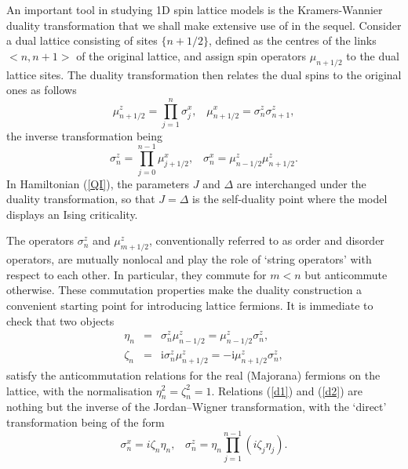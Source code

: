 An important tool in studying 1D spin lattice models
is the Kramers-Wannier duality transformation that
we shall make extensive use of in the sequel. Consider
a dual lattice consisting of sites
$\{n +1/2\}$,
defined as the centres of the links $< n,n+1>$
of the original lattice, and assign spin operators
$\mu_{n+1/2}$ to the dual lattice sites.
The duality transformation then
relates the dual spins to the original ones as
follows
\begin{equation}
\mu^z_{n+1/2}=\prod\limits_{j=1}^n\sigma^x_j,\;\;\;
\mu^x_{n+1/2}=\sigma^z_n\sigma^z_{n+1},
\label{dual}
\end{equation}
the inverse transformation being
\begin{equation}
\sigma^z_{n}=\prod\limits_{j=0}^{n-1}\mu^x_{j+1/2},\;\;\;
\sigma^x_{n}=\mu^z_{n-1/2}\mu^z_{n+1/2}.
\label{dualinv}
\end{equation}
In Hamiltonian (\ref{QI}), the parameters $J$ and
$\Delta$ are interchanged under the duality transformation, so
that $J=\Delta$ is the self-duality point where the
model displays an Ising criticality.

The operators $\sigma^z_n$ and $\mu^z_{m+1/2}$, conventionally referred
to as order and disorder operators,
are mutually nonlocal and
play the role
of `string operators' with respect to each other. In
particular,
they commute for $m<n$ but anticommute
otherwise.
These commutation properties make the duality
construction
a convenient starting point for introducing lattice
fermions. It is immediate to check that two objects
\begin{eqnarray}
\eta_n &=& \sigma^z _n \mu^z _{n-1/2} = \mu^z _{n-1/2}\sigma^z _n, \label{d1}\\
\zeta_n &=& \mbox{i} \sigma^z _n \mu^z _{n+1/2} = - \mbox{i} \mu^z _{n+1/2}\sigma^z _n,
\label{d2}
\end{eqnarray}
satisfy the
anticommutation relations for the
real (Majorana) fermions on the lattice, with the
normalisation
$\eta^2_n=\zeta^2_n=1$. Relations (\ref{d1}) and (\ref{d2})
are nothing but the inverse
of the Jordan--Wigner transformation, with
the `direct' transformation being of the form
\begin{equation}
\sigma^x_n=i\zeta_n\eta_n,\;\;\;
\sigma^z_n=\eta_n\prod\limits_{j=1}^{n-1}\left(i\zeta_j\eta_j\right).
\label{JW}
\end{equation}

